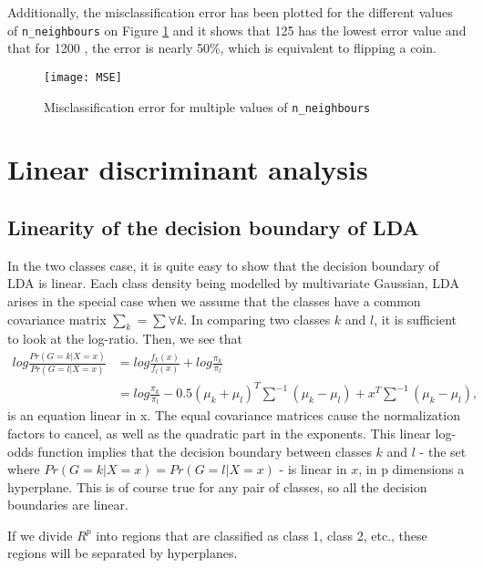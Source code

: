 \documentclass[12pt]{article}
\begin{document}
Additionally, the misclassification error has been plotted for the different values of \texttt{n\_neighbours} on Figure \ref{fig:MSE} and it shows that 125 has the lowest error value and that for 1200 , the error is nearly 50\%, which is equivalent to flipping a coin.

\begin{figure}[H]
    \centering
    \texttt{[image: MSE]}
    \caption{Misclassification error for multiple values of \texttt{n\_neighbours}}
    \label{fig:MSE}
\end{figure}


\section{Linear discriminant analysis}

\subsection{Linearity of the decision boundary of LDA}

In the two classes case, it is quite easy to show that the decision boundary of LDA is linear. Each class density being modelled by multivariate Gaussian, LDA arises in the special case when we assume that the classes have a common covariance matrix $\sum_k = \sum \forall k$. In comparing two classes $k$ and $l$, it is sufficient to look at the log-ratio. Then, we see that
\begin{equation}
\begin{aligned}
    log \frac{Pr(G = k|X = x)}{Pr(G = l|X = x)} &= log \frac{f_k(x)}{f_l(x)} + log \frac{\pi_k}{\pi_l}\\
    &= log \frac{\pi_k}{\pi_l} - 0.5(\mu_k + \mu_l)^T \sum^{-1}(\mu_k - \mu_l) + x^T \sum^{-1}(\mu_k - \mu_l),
\end{aligned}
\end{equation}
is an equation linear in x. The equal covariance matrices cause the normalization factors to cancel, as well as the quadratic part in the exponents. This linear log-odds function implies that the decision boundary between classes $k$ and $l$ - the set where $Pr(G = k|X = x) = Pr(G = l|X = x)$ - is linear in $x$, in p dimensions a hyperplane. This is of course true for any pair of classes, so all the decision boundaries are linear. 

If we divide $R^p$ into regions that are classified as class 1, class 2, etc., these regions will be separated by hyperplanes.
\end{document}
